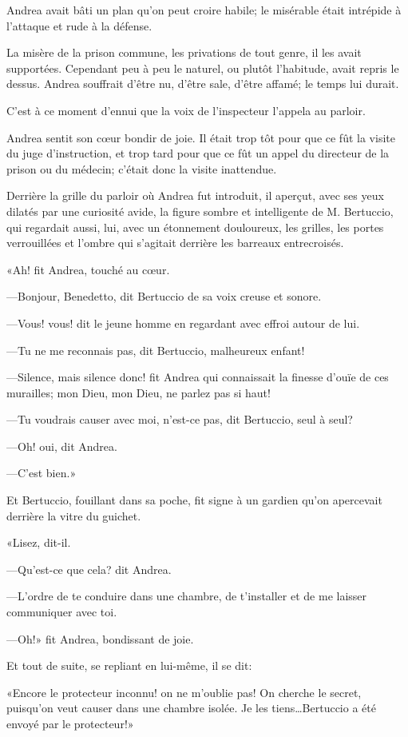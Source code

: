 Andrea avait bâti un plan qu'on peut croire habile; le misérable était intrépide à l'attaque et rude à la défense. 

La misère de la prison commune, les privations de tout genre, il les avait supportées. Cependant peu à peu le naturel, ou plutôt l'habitude, avait repris le dessus. Andrea souffrait d'être nu, d'être sale, d'être affamé; le temps lui durait. 

C'est à ce moment d'ennui que la voix de l'inspecteur l'appela au parloir. 

Andrea sentit son cœur bondir de joie. Il était trop tôt pour que ce fût la visite du juge d'instruction, et trop tard pour que ce fût un appel du directeur de la prison ou du médecin; c'était donc la visite inattendue. 

Derrière la grille du parloir où Andrea fut introduit, il aperçut, avec ses yeux dilatés par une curiosité avide, la figure sombre et intelligente de M. Bertuccio, qui regardait aussi, lui, avec un étonnement douloureux, les grilles, les portes verrouillées et l'ombre qui s'agitait derrière les barreaux entrecroisés. 

«Ah! fit Andrea, touché au cœur. 

—Bonjour, Benedetto, dit Bertuccio de sa voix creuse et sonore. 

—Vous! vous! dit le jeune homme en regardant avec effroi autour de lui. 

—Tu ne me reconnais pas, dit Bertuccio, malheureux enfant! 

—Silence, mais silence donc! fit Andrea qui connaissait la finesse d'ouïe de ces murailles; mon Dieu, mon Dieu, ne parlez pas si haut! 

—Tu voudrais causer avec moi, n'est-ce pas, dit Bertuccio, seul à seul? 

—Oh! oui, dit Andrea. 

—C'est bien.» 

Et Bertuccio, fouillant dans sa poche, fit signe à un gardien qu'on apercevait derrière la vitre du guichet. 

«Lisez, dit-il. 

—Qu'est-ce que cela? dit Andrea. 

—L'ordre de te conduire dans une chambre, de t'installer et de me laisser communiquer avec toi. 

—Oh!» fit Andrea, bondissant de joie. 

Et tout de suite, se repliant en lui-même, il se dit: 

«Encore le protecteur inconnu! on ne m'oublie pas! On cherche le secret, puisqu'on veut causer dans une chambre isolée. Je les tiens\dots Bertuccio a été envoyé par le protecteur!» 


